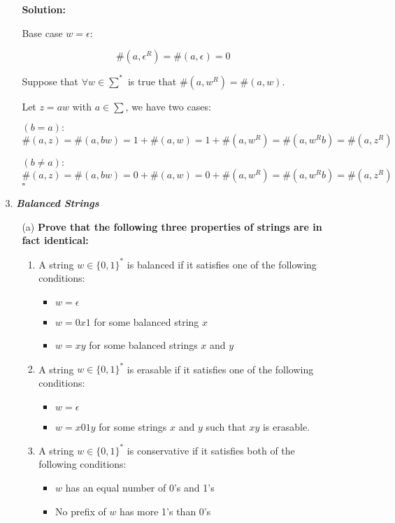 \documentclass[9pt,tikz,border=2mm]{article}
\begin{document}
\begin{enumerate}
\begin{enumerate}
\begin{enumerate}
                \textbf{Solution:}

                Base case $w=\epsilon$: 

                \[\#(a,\epsilon^R) = \#(a,\epsilon) = 0\]

                Suppose that $\forall w \in \sum^*$ is true that $\#(a,w^R) = \#(a,w)$.\newline

                Let $z=aw$ with $a \in \sum$, we have two cases:\newline

                $(b=a):$
                \[\#(a,z) = \#(a,bw) = 1 + \#(a,w) = 1+ \#(a,w^R) = \#(a,w^Rb) = \#(a,z^R)\]
                
                $(b\neq a):$
                \[\#(a,z) = \#(a,bw) = 0 + \#(a,w) = 0 + \#(a,w^R) = \#(a,w^Rb) = \#(a,z^R)\]$\square$
                
                
            \end{enumerate}

        \item[3.] \textbf{\textit{Balanced Strings}}

        \begin{enumerate}
    \item[(a)] \textbf{Prove that the following three properties of strings are in fact identical:}
    \begin{enumerate}
        \item A string \( w \in \{0, 1\}^* \) is balanced if it satisfies one of the following conditions:
            \begin{itemize}
                \item \( w = \epsilon \)
                \item \( w = 0x1 \) for some balanced string \( x \)
                \item \( w = xy \) for some balanced strings \( x \) and \( y \)
            \end{itemize}
        \item A string \( w \in \{0, 1\}^* \) is erasable if it satisfies one of the following conditions:
            \begin{itemize}
                \item \( w = \epsilon \)
                \item \( w = x01y \) for some strings \( x \) and \( y \) such that \( xy \) is erasable.
            \end{itemize}
        \item A string \( w \in \{0, 1\}^* \) is conservative if it satisfies both of the following conditions:
            \begin{itemize}
                \item \( w \) has an equal number of 0’s and 1’s
                \item No prefix of \( w \) has more 1’s than 0’s
            \end{itemize}
    \end{enumerate}


\end{enumerate}
\end{enumerate}
\end{enumerate}
\end{document}
